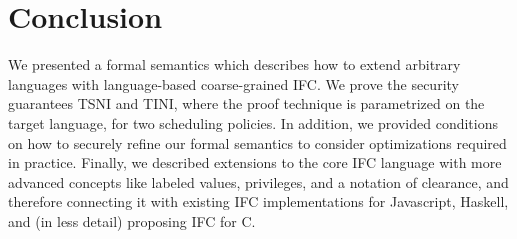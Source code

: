\section{Conclusion}
\label{sec:conclusion}

We presented a formal semantics which describes how to extend arbitrary languages
with language-based coarse-grained IFC. We prove the security guarantees
TSNI and TINI, where the proof technique is parametrized on the
target language, for two scheduling policies. In
addition, we provided conditions on how to securely refine our formal semantics to
consider optimizations required in practice. Finally, we described extensions to
the core IFC language with more advanced concepts like labeled values, privileges,
and a notation of clearance, and therefore connecting it with existing
IFC implementations for Javascript, Haskell, and (in
less detail) proposing IFC for C.


